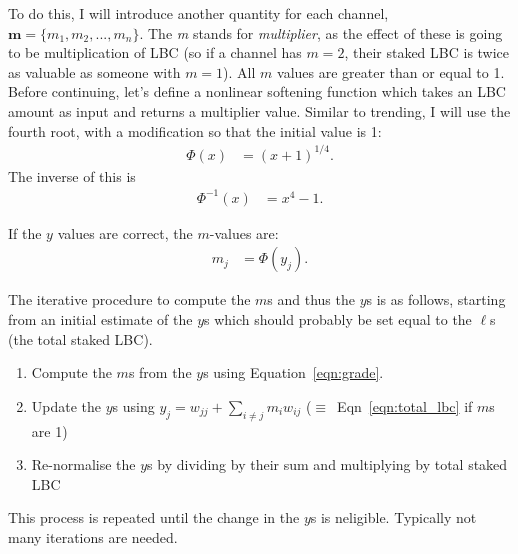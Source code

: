 \documentclass[a4paper, 12pt]{article}
\begin{document}
To do this, I will introduce another quantity for each channel,
$\boldsymbol{m} = \{m_1, m_2, ..., m_n\}$. The {\em m} stands for
{\em multiplier}, as the effect of these is going to be multiplication of LBC
(so if a channel has $m=2$, their staked LBC is twice as valuable as someone
with $m=1$). All $m$ values are greater than or equal to 1.
Before continuing, let's define a nonlinear softening function which takes
an LBC amount as input and returns a multiplier value. Similar to trending,
I will use the fourth root, with a modification so that the initial value
is 1:
\begin{align}
\Phi(x) &= (x + 1)^{1/4}.
\end{align}
The inverse of this is
\begin{align}
\Phi^{-1}(x) &= x^4 - 1.
\end{align}

If the $y$ values are correct, the $m$-values are:
\begin{align}
m_j &= \Phi(y_j). \label{eqn:grade}
\end{align}

The iterative procedure to compute the $m$s and thus the $y$s is as follows,
starting from an initial estimate of the $y$s which should probably be set
equal to the $\ell$s (the total staked LBC).
\begin{enumerate}
\item Compute the $m$s from the $y$s using Equation~\ref{eqn:grade}.
\item Update the $y$s using $y_j = w_{jj} + \sum_{i \neq j} m_i w_{ij}$
($\equiv$~Eqn~\ref{eqn:total_lbc} if $m$s are 1)
\item Re-normalise the $y$s by dividing by their sum and multiplying by total
staked LBC
\end{enumerate}
This process is repeated until the change in the $y$s is neligible. Typically
not many iterations are needed.



\end{document}
